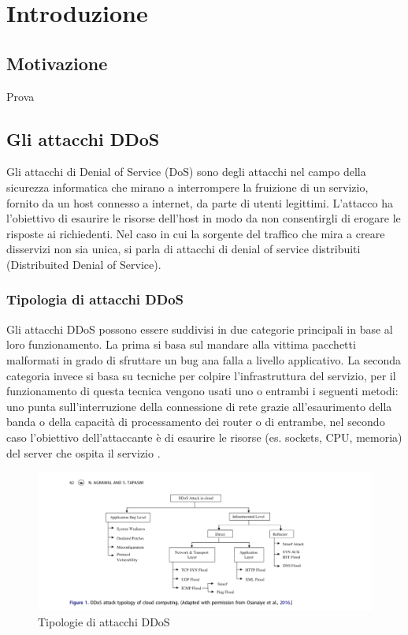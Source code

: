 \chapter{Introduzione}


\section{Motivazione}
Prova


\section{Gli attacchi DDoS}

Gli attacchi di Denial of Service (DoS) sono degli attacchi nel campo della sicurezza informatica che mirano a interrompere la fruizione di un servizio, fornito da un host connesso a internet, da parte di utenti legittimi. L'attacco ha l'obiettivo di esaurire le risorse dell'host in modo da non consentirgli di erogare le risposte ai richiedenti.
Nel caso in cui la sorgente del traffico che mira a creare disservizi non sia unica, si parla di attacchi di denial of service distribuiti (Distribuited Denial of Service).

\subsection{Tipologia di attacchi DDoS}
    
Gli attacchi DDoS possono essere suddivisi in due categorie principali in base al loro funzionamento. La prima si basa sul mandare alla vittima pacchetti malformati in grado di sfruttare un bug ana falla a livello applicativo. La seconda categoria invece si basa su tecniche per colpire l'infrastruttura del servizio, per il funzionamento di questa tecnica vengono usati uno o entrambi i seguenti metodi: uno punta sull'interruzione della connessione di rete grazie all'esaurimento della banda o della capacità di processamento dei router o di entrambe, nel secondo caso l'obiettivo dell'attaccante è di esaurire le risorse (es. sockets, CPU, memoria) del server che ospita il servizio \cite{ddos_survey_1}.

\begin{figure}[h]
    \label{1}
    \includegraphics[width=\hsize]{images/introduzione/tipologie_ddos.png}
    \caption{Tipologie di attacchi DDoS}
    \centering
\end{figure}

